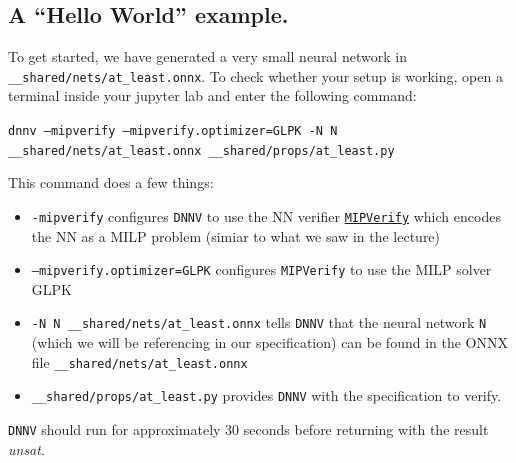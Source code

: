 \documentclass[11pt,fleqn]{article}
\begin{document}
\subsection*{A ``Hello World'' example.}
To get started, we have generated a very small neural network in \texttt{\_\_shared/nets/at\_least.onnx}.
To check whether your setup is working, open a terminal inside your jupyter lab and enter the following command:
\begin{center}
\texttt{dnnv --mipverify --mipverify.optimizer=GLPK -N N \_\_shared/nets/at\_least.onnx \_\_shared/props/at\_least.py}
\end{center}
This command does a few things:
\begin{itemize}
    \item \texttt{-mipverify} configures \texttt{DNNV} to use the NN verifier \href{https://github.com/vtjeng/MIPVerify.jl}{\texttt{MIPVerify}} which encodes the NN as a MILP problem (simiar to what we saw in the lecture)
    \item \texttt{--mipverify.optimizer=GLPK} configures \texttt{MIPVerify} to use the MILP solver GLPK
    \item \texttt{-N N \_\_shared/nets/at\_least.onnx} tells \texttt{DNNV} that the neural network \texttt{N} (which we will be referencing in our specification) can be found in the ONNX file \texttt{\_\_shared/nets/at\_least.onnx}
    \item \texttt{\_\_shared/props/at\_least.py} provides \texttt{DNNV} with the specification to verify.
\end{itemize}
\texttt{DNNV} should run for approximately 30 seconds before returning with the result \textit{unsat}.
\end{document}
